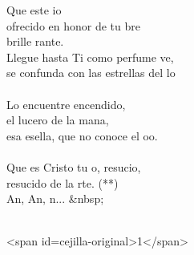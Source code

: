 \begin{cancion}
\begin{chorus}
	Que este io\\
	ofrecido en honor de tu bre\\
	brille rante.\\
	Llegue hasta Ti como perfume ve,\\
	se confunda con las estrellas del lo\\
	\jump\\
Lo encuentre encendido,\\
	el lucero de la mana,\\
	esa esella, que no conoce el oo.\\
	\jump\\
	Que es Cristo tu o, resucio,\\
	resucido de la rte. (**)\\
	An, An, n... &nbsp; \\
	\end{chorus}%
	\jump\\
<span id=cejilla-original>1</span>\\
\end{cancion}%
